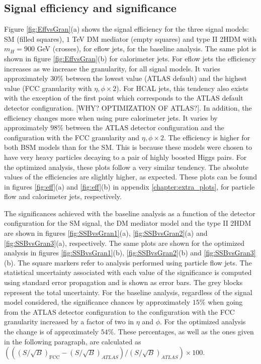 \subsection{Signal efficiency and significance}
\label{sec:granstudies}

Figure \ref{fig:EffvsGran}(a) shows the signal efficiency for the three signal models: SM (filled squares), $1$ TeV DM mediator (empty squares) and type II 2HDM with $m_H=900$ GeV (crosses), for eflow jets, for the baseline analysis. The same plot is shown in figure \ref{fig:EffvsGran}(b) for calorimeter jets. 
For eflow jets the efficiency increases as we increase the granularity, for all signal models. It varies approximately $30\%$ between the lowest value (ATLAS default) and the highest value (FCC granularity with $\eta,\phi\times 2$). For HCAL jets, this tendency also exists with the exception of the first point which corresponds to the ATLAS default detector configuration. [WHY? OPTIMIZATION OF ATLAS?]. In addition, the efficiency changes more when using pure calorimeter jets. It varies by approximately $98\%$ between the ATLAS detector configuration and the configuration with the FCC granularity and $\eta,\phi\times 2$.
The efficiency is higher for both BSM models than for the SM. This is because these models were chosen to have very heavy particles decaying to a pair of highly boosted Higgs pairs. For the optimized analysis, these plots follow a very similar tendency. The absolute values of the efficiencies are slightly higher, as expected. These plots can be found in figures \ref{fig:eff}(a) and \ref{fig:eff}(b) in appendix \ref{chapter:extra_plots}, for particle flow and calorimeter jets, respectively.

The significances achieved with the baseline analysis as a function of the detector configuration for the SM signal, the DM mediator model and the type II 2HDM are shown in figures \ref{fig:SSBvsGran1}(a), \ref{fig:SSBvsGran2}(a) and \ref{fig:SSBvsGran3}(a), respectively. The same plots are shown for the optimized analysis in figures \ref{fig:SSBvsGran1}(b), \ref{fig:SSBvsGran2}(b) and \ref{fig:SSBvsGran3}(b). The square markers refer to analysis performed using particle flow jets. The statistical uncertainty associated with each value of the significance is computed using standard error propagation and is shown as error bars. The grey blocks represent the total uncertainty.
For the baseline analysis, regardless of the signal model considered, the significance chances by approximately $15\%$ when going from the ATLAS detector configuration to the configuration with the FCC granularity increased by a factor of two in $\eta$ and $\phi$. For the optimized analysis the change is of approximately $54\%$. These percentages, as well as the ones given in the following paragraph, are calculated as $\left(((S/\sqrt{B})_{\text{FCC}}-(S/\sqrt{B})_{ATLAS})/(S/\sqrt{B})_{ATLAS}\right)\times 100$.


